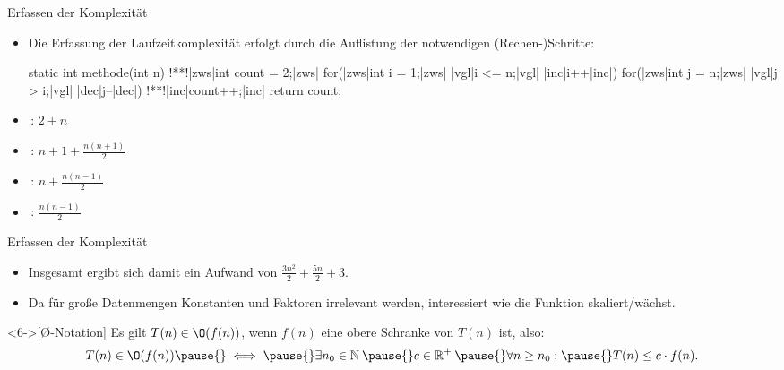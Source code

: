 \begin{frame}[fragile]{Erfassen der Komplexität}
    \begin{itemize}[<+(1)->]
        \widei
        \item Die Erfassung der Laufzeitkomplexität erfolgt durch die Auflistung der notwendigen (Rechen-)Schritte:\pause{}
\begin{plainjava}[language=xJava]
static int methode(int n) {
    !**!|zws|int count = 2;|zws|
        for(|zws|int i = 1;|zws| |vgl|i <= n;|vgl| |inc|i++|inc|) {
            for(|zws|int j = n;|zws| |vgl|j > i;|vgl| |dec|j--|dec|)
                !**!|inc|count++;|inc|
        }
    return count;
}
    \end{plainjava}
    \end{itemize}
    \begin{multicols}{2}
        \begin{itemize}[<+(1)->]
            \item {}\,: \(2+n\)
            \item {}\,: \(n+1+\frac{n(n+1)}{2}\)
            \item {}\,: \(n+\frac{n(n-1)}{2}\)
            \item {}\,: \(\frac{n(n-1)}{2}\)
        \end{itemize}
    \end{multicols}
\end{frame}

\begin{frame}{Erfassen der Komplexität}
    \begin{itemize}[<+(1)->]
        \item Insgesamt ergibt sich damit ein Aufwand von \(\frac{3n^2}{2} + \frac{5n}{2} + 3\).
        \item Da für große Datenmengen Konstanten und Faktoren irrelevant werden,\pause{} interessiert wie die Funktion skaliert/wächst.
    \end{itemize}
    \begin{definition}<6->[\O-Notation]
        \pause{}Es gilt \(T(n) \in \O(f(n))\), wenn \(f(n)\) eine obere Schranke von \(T(n)\) ist, also:\pause{} \[T(n) \in \O(f(n))\pause{}\iff\pause{} \exists n_0 \in \mathbb{N}\:\pause{} c \in \mathbb{R}^+\:\pause{} \forall n \geq n_0:\pause{} T(n) \leq c \cdot f(n).\vspace*{-\topskip}\]
    \end{definition}
\end{frame}

